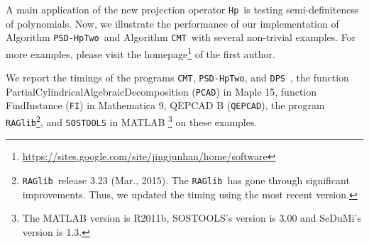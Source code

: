 \documentclass[amsthm]{elsart}
\def  \Hproj {{\tt Hp}}
\def \Proineq {{\tt DPS}}
\def \RAGlib {{\tt RAGlib}}
\def \FI {{\tt FI}}
\def \QEPCAD {{\tt QEPCAD}}
\def \PCAD {{\tt PCAD}}
\def \TwoPro {{\tt PSD-HpTwo}}
\def \FI {{\tt FI}}
\def \QEPCAD {{\tt QEPCAD}}
\def \PCAD {{\tt PCAD}}
\def \TCPT {{\tt CMT}}
\begin{document}
A main application of the new projection operator \Hproj\ is testing semi-definiteness of polynomials. Now, we illustrate the performance of our implementation of Algorithm \TwoPro\ and Algorithm \TCPT\ with several non-trivial examples. For more examples, please visit the homepage\footnote{\url{https://sites.google.com/site/jingjunhan/home/software}} of the first author.

We report the timings of the programs \TCPT, \TwoPro, and \Proineq\ \citep{han2016proving}, the function PartialCylindricalAlgebraicDecomposition (\PCAD) in Maple 15, function FindInstance (\FI) in Mathematica 9, QEPCAD B (\QEPCAD), the program \RAGlib \footnote{\RAGlib\ release 3.23 (Mar., 2015). The \RAGlib\ has gone through significant improvements. Thus, we updated the timing using the most recent version.}, and {\tt SOSTOOLS} in MATLAB \footnote{The MATLAB version is R2011b, SOSTOOLS's version is 3.00 and SeDuMi's version is 1.3.} on these examples.
\end{document}
